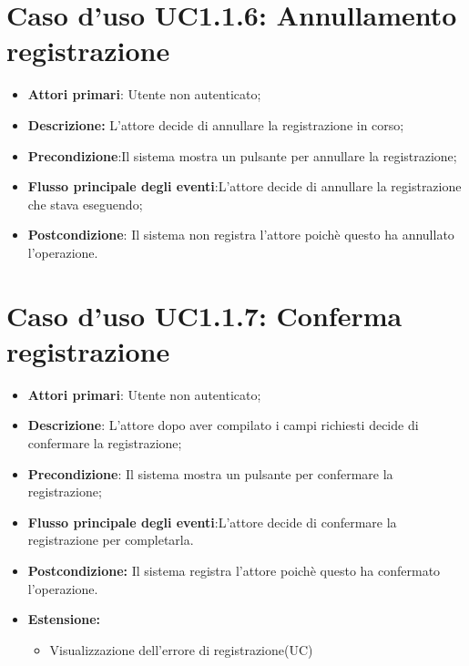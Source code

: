 		\section{Caso d'uso UC1.1.6: Annullamento registrazione}
		\begin{itemize}
			\item \textbf{Attori primari}: Utente non autenticato;
			\item \textbf{Descrizione:} L'attore decide di annullare la registrazione in corso;
			\item \textbf{Precondizione}:Il sistema mostra un pulsante per annullare la  registrazione;
			\item \textbf{Flusso principale degli eventi}:L'attore decide di annullare la registrazione che stava eseguendo;
			\item \textbf{Postcondizione}: Il sistema non registra l'attore poichè questo ha annullato l'operazione.
		\end{itemize}
		\section{Caso d'uso UC1.1.7: Conferma registrazione}
		\begin{itemize}
			\item \textbf{Attori primari}: Utente non autenticato;
			\item \textbf{Descrizione}: L'attore dopo aver compilato i campi richiesti decide di confermare  la registrazione;
			\item \textbf{Precondizione}: Il sistema mostra un pulsante per confermare la registrazione;
			\item \textbf{Flusso principale degli eventi}:L'attore decide di confermare la registrazione per completarla.
			\item \textbf{Postcondizione:} Il sistema registra l'attore poichè questo ha confermato l'operazione.
			\item \textbf{Estensione:}
			\begin{itemize}
				\item Visualizzazione dell'errore di registrazione(UC)
			\end{itemize}
		\end{itemize}

